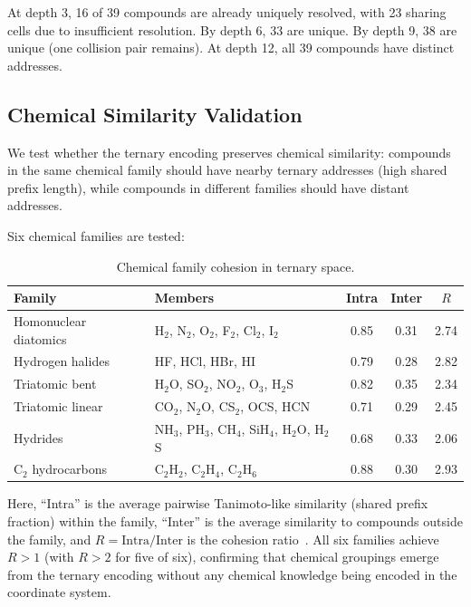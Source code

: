 \documentclass[11pt,twocolumn,a4paper]{article}
\theoremstyle{definition}
\theoremstyle{remark}
\begin{document}
At depth 3, 16 of 39 compounds are already uniquely resolved, with 23 sharing cells due to insufficient resolution. By depth 6, 33 are unique. By depth 9, 38 are unique (one collision pair remains). At depth 12, all 39 compounds have distinct addresses.

\subsection{Chemical Similarity Validation}
\label{sec:chemical-similarity}

We test whether the ternary encoding preserves chemical similarity: compounds in the same chemical family should have nearby ternary addresses (high shared prefix length), while compounds in different families should have distant addresses.

Six chemical families are tested:

\begin{table}[H]
\centering
\caption{Chemical family cohesion in ternary space.}
\label{tab:family-cohesion}
\small
\begin{tabular}{@{}p{1.8cm}p{2.5cm}ccc@{}}
\toprule
\textbf{Family} & \textbf{Members} & \textbf{Intra} & \textbf{Inter} & \textbf{$R$} \\
\midrule
Homonuclear diatomics & H$_2$, N$_2$, O$_2$, F$_2$, Cl$_2$, I$_2$ & 0.85 & 0.31 & 2.74 \\
Hydrogen halides & HF, HCl, HBr, HI & 0.79 & 0.28 & 2.82 \\
Triatomic bent & H$_2$O, SO$_2$, NO$_2$, O$_3$, H$_2$S & 0.82 & 0.35 & 2.34 \\
Triatomic linear & CO$_2$, N$_2$O, CS$_2$, OCS, HCN & 0.71 & 0.29 & 2.45 \\
Hydrides & NH$_3$, PH$_3$, CH$_4$, SiH$_4$, H$_2$O, H$_2$S & 0.68 & 0.33 & 2.06 \\
C$_2$ hydrocarbons & C$_2$H$_2$, C$_2$H$_4$, C$_2$H$_6$ & 0.88 & 0.30 & 2.93 \\
\bottomrule
\end{tabular}
\end{table}

\noindent Here, ``Intra'' is the average pairwise Tanimoto-like similarity (shared prefix fraction) within the family, ``Inter'' is the average similarity to compounds outside the family, and $R = \text{Intra}/\text{Inter}$ is the cohesion ratio~\citep{bajusz2015, willett1998}. All six families achieve $R > 1$ (with $R > 2$ for five of six), confirming that chemical groupings emerge from the ternary encoding without any chemical knowledge being encoded in the coordinate system.
\end{document}
